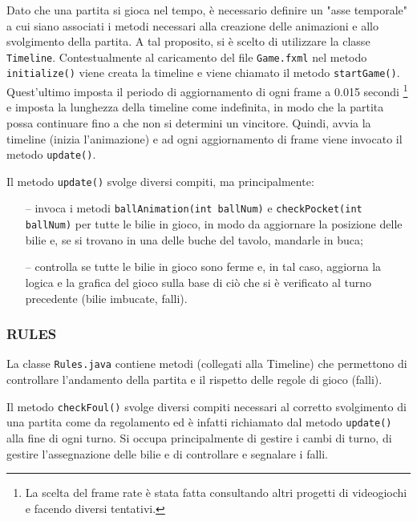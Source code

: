 \documentclass[12pt,a4paper]{report}
\begin{document}
\vspace{3mm}

Dato che una partita si gioca nel tempo, è necessario definire un "asse temporale" a cui siano associati i metodi necessari alla creazione delle animazioni e allo svolgimento della partita.
A tal proposito, si è scelto di utilizzare la classe \texttt{Timeline}.
Contestualmente al caricamento del file \texttt{Game.fxml} nel metodo \texttt{initialize()} viene creata la timeline e viene chiamato il metodo \texttt{startGame()}.
Quest'ultimo imposta il periodo di aggiornamento di ogni frame a 0.015 secondi \footnote{La scelta del frame rate è stata fatta consultando altri progetti di videogiochi e facendo diversi tentativi.} e imposta la lunghezza della timeline come indefinita, in modo che la partita possa continuare fino a che non si determini un vincitore.
Quindi, avvia la timeline (inizia l'animazione) e ad ogni aggiornamento di frame viene invocato il metodo \texttt{update()}.

\vspace{3mm}

Il metodo \texttt{update()} svolge diversi compiti, ma principalmente:
\begin{itemize}
	\item [--] invoca i metodi \texttt{ballAnimation(int ballNum)} e \texttt{checkPocket(int ballNum)} per tutte le bilie in gioco, in modo da aggiornare la posizione delle bilie e, se si trovano in una delle buche del tavolo, mandarle in buca;
	\item [--] controlla se tutte le bilie in gioco sono ferme e, in tal caso, aggiorna la logica e la grafica del gioco sulla base di ciò che si è verificato al turno precedente (bilie imbucate, falli).
\end{itemize}

\subsubsection*{RULES}
La classe \texttt{Rules.java} contiene metodi (collegati alla Timeline) che permettono di controllare l'andamento della partita e il rispetto delle regole di gioco (falli).

\vspace{3mm}

Il metodo \texttt{checkFoul()} svolge diversi compiti necessari al corretto svolgimento di una partita come da regolamento ed è infatti richiamato dal metodo \texttt{update()} alla fine di ogni turno.
Si occupa principalmente di gestire i cambi di turno, di gestire l'assegnazione delle bilie e di controllare e segnalare i falli.
\end{document}
